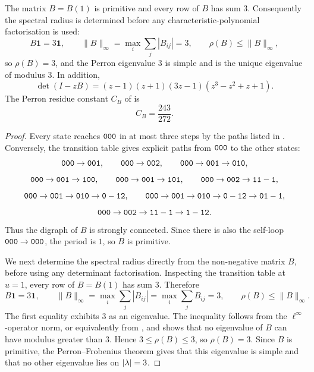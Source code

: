 \begin{proposition}
  \label{prop:sync-kernel-spectrum}
  The matrix \(B=B(1)\) is primitive and every row of \(B\) has sum
  \(3\). Consequently the spectral radius is determined before any
  characteristic-polynomial factorisation is used:
  \[
    B\mathbf 1=3\mathbf 1,\qquad
    \|B\|_\infty=\max_i\sum_j |B_{ij}|=3,\qquad
    \rho(B)\le \|B\|_\infty,
  \]
  so \(\rho(B)=3\), and the Perron eigenvalue \(3\) is simple and is
  the unique eigenvalue of modulus \(3\).
  In addition,
  \[
    \det(I-zB)=(z-1)(z+1)(3z-1)(z^3-z^2+z+1).
  \]
  The Perron residue constant \(C_B\) of
   is
  \[
    C_B=\frac{243}{272}.
  \]
\end{proposition}

\begin{proof}
Every state reaches \(\mathtt{000}\) in at most three steps by the paths
listed in . Conversely, the transition table gives
explicit paths from \(\mathtt{000}\) to the other states:
\[
  \mathtt{000}\to\mathtt{001},\qquad
  \mathtt{000}\to\mathtt{002},\qquad
  \mathtt{000}\to\mathtt{001}\to\mathtt{010},
\]
\[
  \mathtt{000}\to\mathtt{001}\to\mathtt{100},\qquad
  \mathtt{000}\to\mathtt{001}\to\mathtt{101},\qquad
  \mathtt{000}\to\mathtt{002}\to\mathtt{11-1},
\]
\[
  \mathtt{000}\to\mathtt{001}\to\mathtt{010}\to\mathtt{0-12},\qquad
  \mathtt{000}\to\mathtt{001}\to\mathtt{010}\to\mathtt{0-12}\to\mathtt{01-1},
\]
\[
  \mathtt{000}\to\mathtt{002}\to\mathtt{11-1}\to\mathtt{1-12}.
\]
Thus the digraph of \(B\) is strongly connected. Since there is also the
self-loop \(\mathtt{000}\to\mathtt{000}\), the period is \(1\), so \(B\) is primitive.

We next determine the spectral radius directly from the non-negative
matrix \(B\), before using any determinant factorisation. Inspecting the
transition table at \(u=1\), every row of \(B=B(1)\) has sum \(3\).
Therefore
\[
  B\mathbf 1=3\mathbf 1,\qquad
  \|B\|_\infty=\max_i\sum_j |B_{ij}|=\max_i\sum_j B_{ij}=3,
  \qquad
  \rho(B)\le\|B\|_\infty.
\]
The first equality exhibits \(3\) as an eigenvalue. The inequality
follows from the \(\ell^\infty\)-operator norm, or equivalently from
, and shows that no eigenvalue of \(B\)
can have modulus greater than \(3\). Hence \(3\le\rho(B)\le3\), so
\(\rho(B)=3\). Since \(B\) is primitive, the Perron--Frobenius theorem
gives that this eigenvalue is simple and that no other eigenvalue lies
on \(\lvert \lambda \rvert=3\).


\end{proof}
